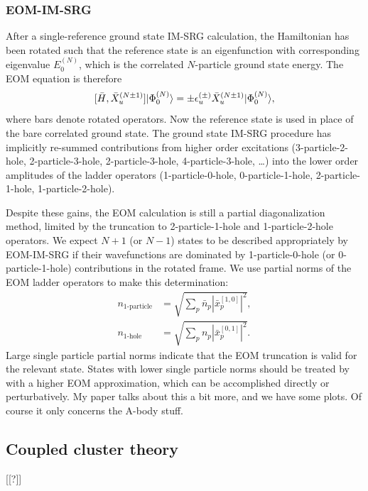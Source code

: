 \subsubsection*{EOM-IM-SRG}
After a single-reference ground state IM-SRG calculation, the Hamiltonian has been rotated such that the reference state is an eigenfunction with corresponding eigenvalue $E^{(N)}_0$, which is the correlated $N$-particle ground state energy. The EOM equation is therefore
\begin{equation}\label{eq:EOMIMSRG}
  [\bar{H},\bar{X}^{(N \pm 1)}_u] | \Phi^{(N)}_0 \rangle = \pm \epsilon^{(\pm)}_u \bar{X}^{(N \pm 1)}_u | \Phi^{(N)}_0 \rangle,
\end{equation}
where bars denote rotated operators. Now the reference state is used in place of the bare correlated ground state. The ground state IM-SRG procedure has implicitly re-summed contributions from higher order excitations (3-particle-2-hole, 2-particle-3-hole, 2-particle-3-hole, 4-particle-3-hole, \ldots) into the lower order amplitudes of the ladder operators (1-particle-0-hole, 0-particle-1-hole, 2-particle-1-hole, 1-particle-2-hole).

Despite these gains, the EOM calculation is still a partial diagonalization method, limited by the truncation to 2-particle-1-hole and 1-particle-2-hole operators. We expect $N + 1$ (or $N - 1$) states to be described appropriately by EOM-IM-SRG if their wavefunctions are dominated by 1-particle-0-hole (or 0-particle-1-hole) contributions in the rotated frame. We use partial norms of the EOM ladder operators to make this determination:
\begin{align}\label{eq:partial_norms}
  n_{\text{1-particle}} &= \sqrt{\sum_p \bar{n}_p | \bar{x}^{[1,0]}_p |^2},\\
  n_{\text{1-hole}} &= \sqrt{\sum_p n_p | \bar{x}^{[0,1]}_p |^2}.
\end{align}
Large single particle partial norms indicate that the EOM truncation is valid for the relevant state. States with lower single particle norms should be treated by with a higher EOM approximation, which can be accomplished directly or perturbatively. {\color{red} My paper talks about this a bit more, and we have some plots. Of course it only concerns the A-body stuff}.

\subsection{Coupled cluster theory}

[[?]]

